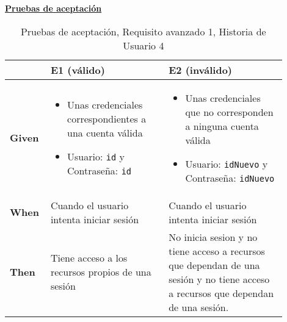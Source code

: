 \documentclass[../ei103948-project-documentation.tex]{subfiles}
\begin{document}
\begin{center}
					\descripcionAvanzadaD

					\textbf{\underline{Pruebas de aceptación}}
					\begin{table}[H]
						\centering
						\begin{tabular}{|p{0.10\linewidth}|p{0.40\linewidth}|p{0.40\linewidth}|}
							\hline
							\textbf{}      & \textbf{E1 (válido)}                                                                                & \textbf{E2 (inválido)}                                                                               \\ \hline
							\textbf{Given} & 
							\begin{itemize}\vspace{-5mm}\setlength\itemsep{0mm}\setlength\parskip{0mm}\setlength{\itemindent}{-5mm}
								\item Unas credenciales correspondientes a una cuenta válida
								\item Usuario: \texttt{id} y Contraseña: \texttt{id}
							\end{itemize} & 
							\begin{itemize}\vspace{-5mm}\setlength\itemsep{0mm}\setlength\parskip{0mm}\setlength{\itemindent}{-5mm}
								\item Unas credenciales que no corresponden a ninguna cuenta válida
								\item Usuario: \texttt{idNuevo} y Contraseña: \texttt{idNuevo}
							\end{itemize} \\ \hline
							\textbf{When}  & Cuando el usuario intenta iniciar sesión                                                            & Cuando el usuario intenta iniciar sesión                                                             \\ \hline
							\textbf{Then}  &  Tiene acceso a los recursos propios de una sesión                                                    &       No inicia sesion y no tiene acceso a recursos que dependan de una sesión y no tiene acceso a recursos que dependan de una sesión.                                                                                         \\ \hline
							\end{tabular}
						\caption{Pruebas de aceptación, Requisito avanzado 1, Historia de Usuario 4}
					\end{table}
					\end{center}
\end{document}

